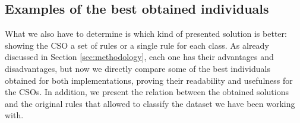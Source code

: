 
\subsection{Examples of the best obtained individuals}
\label{subsec:examples}

What we also have to determine is which kind of presented solution is better: showing the CSO a set of rules or a single rule for each class. As already discussed in Section \ref{sec:methodology}, each one has their advantages and disadvantages, but now we directly compare some of the best individuals obtained for both implementations, proving their readability and usefulness for the CSOs. In addition, we present the relation between the obtained solutions and the original rules that allowed to classify the dataset we have been working with.

